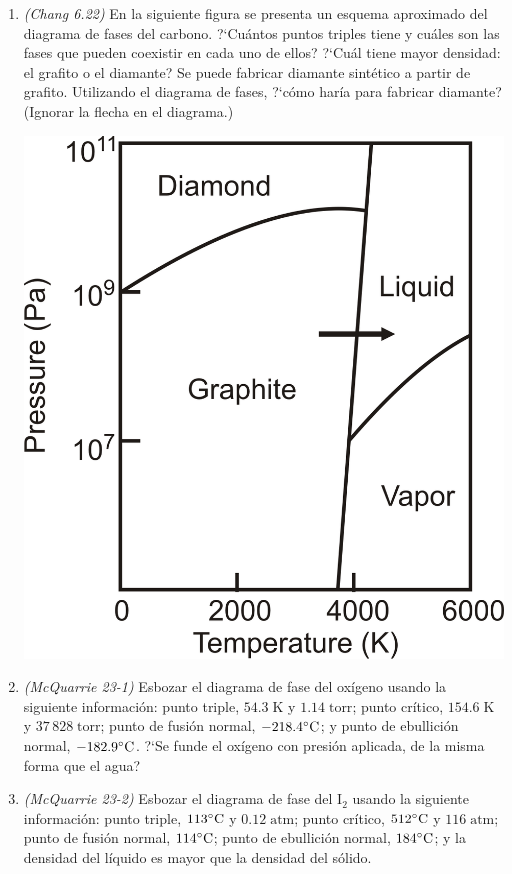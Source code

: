 \documentclass[a4paper,12pt]{article}
\begin{document}
\begin{enumerate}
 \item \textit{(Chang 6.22)} En la siguiente figura se presenta un esquema aproximado del diagrama de fases del carbono. ?`Cu\'antos puntos triples tiene y cu\'ales son las fases que pueden coexistir en cada uno de ellos? ?`Cu\'al tiene mayor densidad: el grafito o el diamante? Se puede fabricar diamante sint\'etico a partir de grafito. Utilizando el diagrama de fases, ?`c\'omo har\'ia para fabricar diamante? (Ignorar la flecha en el diagrama.)
\begin{center}
 \includegraphics[scale=0.6]{figure4}
\end{center} %

 \item \textit{(McQuarrie 23-1)} Esbozar el diagrama de fase del ox\'igeno usando la siguiente informaci\'on: punto triple, $54.3\;\mbox{K}$ y $1.14\;\mbox{torr}$; punto cr\'itico, $154.6\;\mbox{K}$ y $37\,828\;\mbox{torr}$; punto de fusi\'on normal, $-218.4\celsius$; y punto de ebullici\'on normal, $-182.9\celsius$. ?`Se funde el ox\'igeno con presi\'on aplicada, de la misma forma que el agua? %

 \item \textit{(McQuarrie 23-2)} Esbozar el diagrama de fase del $\mbox{I}_2$ usando la siguiente informaci\'on: punto triple, $113\celsius$ y $0.12\;\mbox{atm}$; punto cr\'itico, $512\celsius$ y $116\;\mbox{atm}$; punto de fusi\'on normal, $114\celsius$; punto de ebullici\'on normal, $184\celsius$; y la densidad del l\'iquido es mayor que la densidad del s\'olido. %


\end{enumerate}
\end{document}
